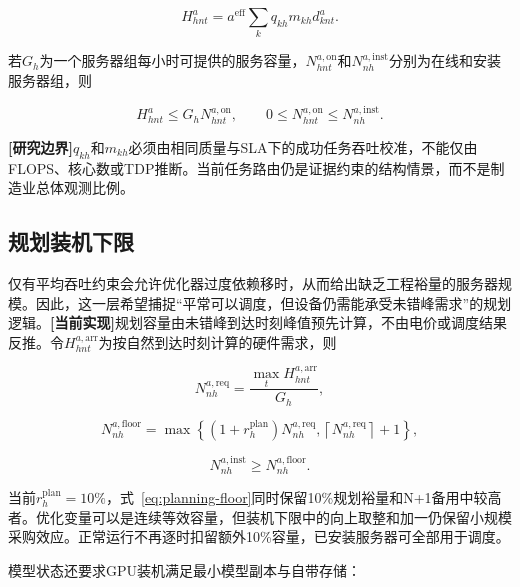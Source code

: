 \documentclass[preprint]{elsarticle}
\newcommand{\implemented}{\textcolor{green!40!black}{\textbf{[当前实现]}}}
\newcommand{\boundary}{\textcolor{black!65}{\textbf{[研究边界]}}}
\begin{document}
\begin{equation}
 H^a_{hnt}=a^{\mathrm{eff}}\sum_kq_{kh}m_{kh}d^a_{knt}.
 \label{eq:hardware-compute}
\end{equation}

若$G_h$为一个服务器组每小时可提供的服务容量，$N^{a,\mathrm{on}}_{hnt}$和$N^{a,\mathrm{inst}}_{nh}$分别为在线和安装服务器组，则

\begin{equation}
 H^a_{hnt}\leq G_hN^{a,\mathrm{on}}_{hnt},\qquad
 0\leq N^{a,\mathrm{on}}_{hnt}\leq N^{a,\mathrm{inst}}_{nh}.
 \label{eq:throughput}
\end{equation}

\boundary $q_{kh}$和$m_{kh}$必须由相同质量与SLA下的成功任务吞吐校准，不能仅由FLOPS、核心数或TDP推断。当前任务路由仍是证据约束的结构情景，而不是制造业总体观测比例。

\subsection{规划装机下限}

仅有平均吞吐约束会允许优化器过度依赖移时，从而给出缺乏工程裕量的服务器规模。因此，这一层希望捕捉“平常可以调度，但设备仍需能承受未错峰需求”的规划逻辑。\implemented 规划容量由未错峰到达时刻峰值预先计算，不由电价或调度结果反推。令$H^{a,\mathrm{arr}}_{hnt}$为按自然到达时刻计算的硬件需求，则

\begin{equation}
 N^{a,\mathrm{req}}_{nh}=\frac{\max_tH^{a,\mathrm{arr}}_{hnt}}{G_h},
 \label{eq:required-groups}
\end{equation}

\begin{equation}
 N^{a,\mathrm{floor}}_{nh}=
 \max\left\{(1+r_h^{\mathrm{plan}})N^{a,\mathrm{req}}_{nh},
 \left\lceil N^{a,\mathrm{req}}_{nh}\right\rceil+1\right\},
 \label{eq:planning-floor}
\end{equation}

\begin{equation}
 N^{a,\mathrm{inst}}_{nh}\geq N^{a,\mathrm{floor}}_{nh}.
 \label{eq:installed-floor}
\end{equation}

当前$r_h^{\mathrm{plan}}=10\%$，式~\eqref{eq:planning-floor}同时保留10\%规划裕量和N+1备用中较高者。优化变量可以是连续等效容量，但装机下限中的向上取整和加一仍保留小规模采购效应。正常运行不再逐时扣留额外10\%容量，已安装服务器可全部用于调度。

模型状态还要求GPU装机满足最小模型副本与自带存储：
\end{document}
